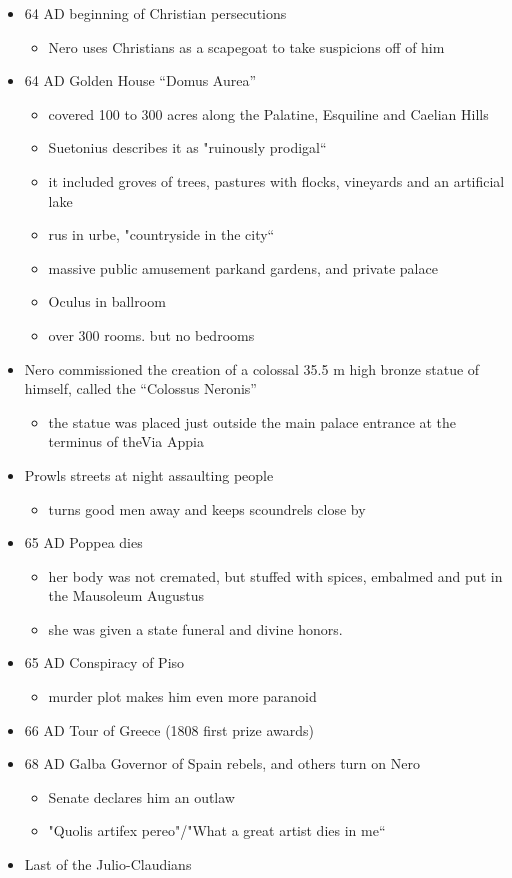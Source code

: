 \documentclass[12pt, twoside]{article}
\begin{document}
\begin{itemize}
\item 64 AD beginning of Christian persecutions
	\begin{itemize}
	\item Nero uses Christians as a scapegoat to take suspicions off of him
	\end{itemize}
\item 64 AD Golden House “Domus Aurea”
	\begin{itemize}
	\item covered 100 to 300 acres along the Palatine, Esquiline and Caelian Hills
	\item Suetonius describes it as "ruinously prodigal“
	\item it included groves of trees, pastures with flocks, vineyards and an artificial lake
	\item rus in urbe, "countryside in the city“
	\item massive public amusement parkand gardens, and private palace
	\item Oculus in ballroom
	\item over 300 rooms. but no bedrooms
	\end{itemize}
\item Nero commissioned the creation of a colossal 35.5 m high bronze statue of himself, called the “Colossus Neronis”
	\begin{itemize}
	\item the statue was placed just outside the main palace entrance at the terminus of theVia Appia
	\end{itemize}
\item Prowls streets at night assaulting people
	\begin{itemize}
	\item turns good men away and keeps scoundrels close by
	\end{itemize}
\item 65 AD Poppea dies
	\begin{itemize}
	\item her body was not cremated, but stuffed with spices, embalmed and put in the Mausoleum Augustus
	\item she was given a state funeral and divine honors.
	\end{itemize}
\item 65 AD Conspiracy of Piso
	\begin{itemize}
	\item murder plot makes him even more paranoid
	\end{itemize}
\item 66 AD Tour of Greece (1808 first prize awards)
\item 68 AD Galba Governor of Spain rebels, and others turn on Nero
	\begin{itemize}
	\item Senate declares him an outlaw
	\item "Quolis artifex pereo"/"What a great artist dies in me“
	\end{itemize}
\item Last of the Julio-Claudians
\end{itemize}
\end{document}
